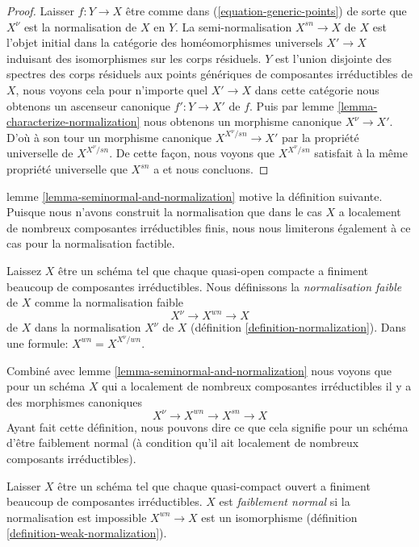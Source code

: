 \begin{proof}

Laisser $f : Y \to X$ être comme dans (\ref{equation-generic-points}) de sorte que $X^\nu$ est la normalisation de $X$ en $Y$. La semi-normalisation $X^{sn} \to X$ de $X$ est l'objet initial dans la catégorie des homéomorphismes universels $X' \to X$ induisant des isomorphismes sur les corps résiduels. $Y$ est l'union disjointe des spectres des corps résiduels aux points génériques de composantes irréductibles de $X$, nous voyons cela pour n'importe quel $X' \to X$ dans cette catégorie nous obtenons un ascenseur canonique $f' : Y \to X'$ de $f$. Puis par lemme \ref{lemma-characterize-normalization}
nous obtenons un morphisme canonique $X^\nu \to X'$. D'où à son tour un morphisme canonique $X^{X^\nu/sn} \to X'$
par la propriété universelle de $X^{X^\nu/sn}$. De cette façon, nous voyons que $X^{X^\nu/sn}$ satisfait à la même propriété universelle que $X^{sn}$ a et nous concluons.

\end{proof}

\noindent
lemme \ref{lemma-seminormal-and-normalization} motive la définition suivante. Puisque nous n'avons construit la normalisation que dans le cas $X$ a localement de nombreux composantes irréductibles finis, nous nous limiterons également à ce cas pour la normalisation factible.

\begin{definition}

\label{definition-weak-normalization}
Laissez $X$ être un schéma tel que chaque quasi-open compacte a finiment beaucoup de composantes irréductibles. Nous définissons la {\it normalisation faible} de $X$ comme la normalisation faible $$
X^\nu \longrightarrow X^{wn} \longrightarrow X
$$ de $X$ dans la normalisation $X^\nu$ de $X$ (définition \ref{definition-normalization}). Dans une formule: $X^{wn} = X^{X^\nu/wn}$.
\end{definition}

\noindent
Combiné avec lemme \ref{lemma-seminormal-and-normalization} nous voyons que pour un schéma $X$ qui a localement de nombreux composantes irréductibles il y a des morphismes canoniques $$
X^\nu \to X^{wn} \to X^{sn} \to X
$$ Ayant fait cette définition, nous pouvons dire ce que cela signifie pour un schéma d'être faiblement normal (à condition qu'il ait localement de nombreux composants irréductibles).

\begin{definition}

\label{definition-weakly-normal}

Laisser $X$ être un schéma tel que chaque quasi-compact ouvert a finiment beaucoup de composantes irréductibles. $X$ est {\it faiblement normal} si la normalisation est impossible $X^{wn} \to X$ est un isomorphisme (définition \ref{definition-weak-normalization}).

\end{definition}

